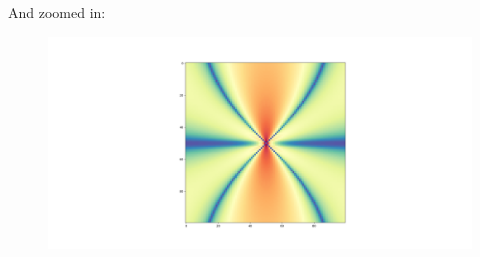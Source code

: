 \documentclass[12pt,a4paper]{article}
\theoremstyle{plain}
\begin{document}
\par And zoomed in:

\begin{figure}[H]
\centering
\includegraphics[width=1.\textwidth]{../week02/stess_field.png}
\end{figure}
\end{document}
